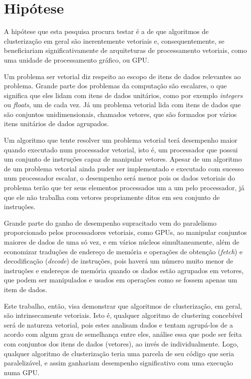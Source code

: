 \documentclass[12pt, %
openright, 
oneside, %
a4paper,    %
brazil]{facom-ufu-abntex2}
\begin{document}




\section{Hipótese}

A hipótese que esta pesquisa procura testar é a de que algoritmos de clusterização em geral são inerentemente vetoriais e, consequentemente, se beneficiariam significativamente de arquiteturas de processamento vetoriais, como uma unidade de processamento gráfico, ou GPU.

Um problema ser vetorial diz respeito ao escopo de itens de dados relevantes ao problema. Grande parte dos problemas da computação são escalares, o que significa que eles lidam com itens de dados unitários, como por exemplo \textit{integers} ou \textit{floats}, um de cada vez. Já um problema vetorial lida com itens de dados que são conjuntos unidimensionais, chamados vetores, que são formados por vários itens unitários de dados agrupados.

Um algoritmo que tente resolver um problema vetorial terá desempenho maior quando executado num processador vetorial, isto é, um processador que possui um conjunto de instruções capaz de manipular vetores. Apesar de um algoritmo de um problema vetorial ainda puder ser implementado e executado com sucesso num processador escalar, o desempenho será menor pois os dados vetoriais do problema terão que ter seus elementos processados um a um pelo processador, já que ele não trabalha com vetores propriamente ditos em seu conjunto de instruções.

Grande parte do ganho de desempenho supracitado vem do paralelismo proporcionado pelos processadores vetoriais, como GPUs, ao manipular conjuntos maiores de dados de uma só vez, e em vários núcleos simultaneamente, além de economizar traduções de endereço de memória e operações de obtenção (\textit{fetch}) e decodificação (\textit{decode}) de instruções, pois haverá um número muito menor de instruções e endereços de memória quando os dados estão agrupados em vetores, que podem ser manipulados e usados em operações como se fossem apenas um item de dados.

Este trabalho, então, visa demonstrar que algoritmos de clusterização, em geral, são intrinsecamente vetoriais. Isto é, qualquer algoritmo de clustering concebível será de natureza vetorial, pois estes analisam dados e tentam agrupá-los de a acordo com algum grau de semelhança entre eles, análise essa que pode ser feita com conjuntos dos itens de dados (vetores), ao invés de individualmente. Logo, qualquer algoritmo de clusterização teria uma parcela de seu código que seria paralelizável, e assim ganhariam desempenho significativo com uma execução numa GPU.
\end{document}
